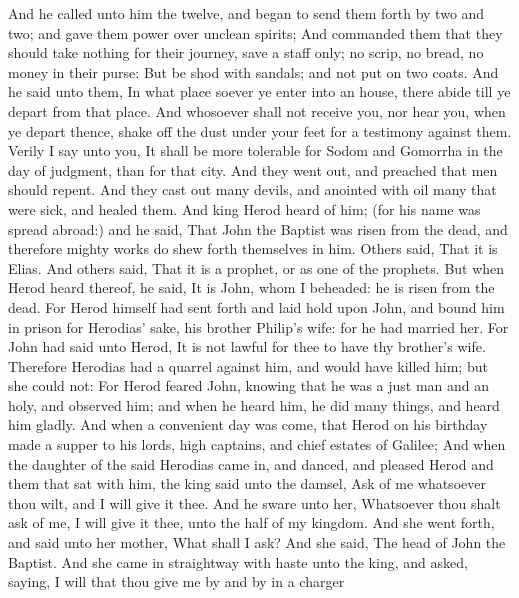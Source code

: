  And he called unto him the twelve, and began to send them
forth by two and two; and gave them power over unclean spirits;
 And commanded them that they should take nothing for their
journey, save a staff only; no scrip, no bread, no money in their purse:
 But be shod with sandals; and not put on two coats.
 And he said unto them, In what place soever ye enter into
an house, there abide till ye depart from that place.  And
whosoever shall not receive you, nor hear you, when ye depart thence,
shake off the dust under your feet for a testimony against them. Verily
I say unto you, It shall be more tolerable for Sodom and Gomorrha in the
day of judgment, than for that city.  And they went out,
and preached that men should repent.  And they cast out
many devils, and anointed with oil many that were sick, and healed them.
 And king Herod heard of him; (for his name was spread
abroad:) and he said, That John the Baptist was risen from the dead, and
therefore mighty works do shew forth themselves in him. 
Others said, That it is Elias. And others said, That it is a prophet, or
as one of the prophets.  But when Herod heard thereof, he
said, It is John, whom I beheaded: he is risen from the dead.
 For Herod himself had sent forth and laid hold upon John,
and bound him in prison for Herodias' sake, his brother Philip's wife:
for he had married her.  For John had said unto Herod, It
is not lawful for thee to have thy brother's wife. 
Therefore Herodias had a quarrel against him, and would have killed him;
but she could not:  For Herod feared John, knowing that he
was a just man and an holy, and observed him; and when he heard him, he
did many things, and heard him gladly.  And when a
convenient day was come, that Herod on his birthday made a supper to his
lords, high captains, and chief estates of Galilee;  And
when the daughter of the said Herodias came in, and danced, and pleased
Herod and them that sat with him, the king said unto the damsel, Ask of
me whatsoever thou wilt, and I will give it thee.  And he
sware unto her, Whatsoever thou shalt ask of me, I will give it thee,
unto the half of my kingdom.  And she went forth, and said
unto her mother, What shall I ask? And she said, The head of John the
Baptist.  And she came in straightway with haste unto the
king, and asked, saying, I will that thou give me by and by in a charger
